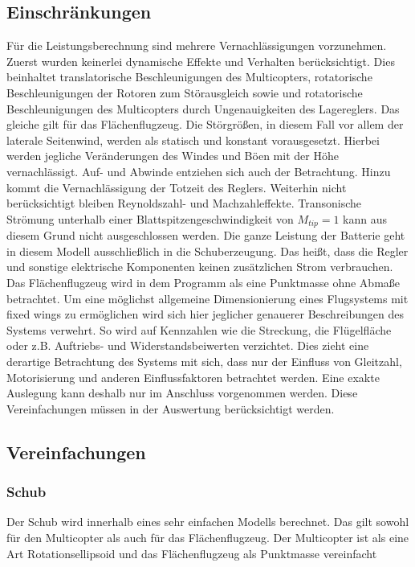 \subsection{Einschränkungen}
Für die Leistungsberechnung sind mehrere Vernachlässigungen vorzunehmen. Zuerst wurden keinerlei dynamische Effekte und Verhalten berücksichtigt. Dies beinhaltet translatorische Beschleunigungen des Multicopters, rotatorische Beschleunigungen der Rotoren zum Störausgleich sowie und rotatorische Beschleunigungen des Multicopters durch Ungenauigkeiten des Lagereglers. Das gleiche gilt für das Flächenflugzeug. 
Die Störgrößen, in diesem Fall vor allem der laterale Seitenwind, werden als statisch und konstant vorausgesetzt. Hierbei werden jegliche Veränderungen des Windes und Böen mit der Höhe vernachlässigt. Auf- und Abwinde entziehen sich auch der Betrachtung. Hinzu kommt die Vernachlässigung der Totzeit des Reglers. 
Weiterhin nicht berücksichtigt bleiben Reynoldszahl- und Machzahleffekte. Transonische Strömung unterhalb einer Blattspitzengeschwindigkeit von \ensuremath{M_{tip}=1} kann aus diesem Grund nicht ausgeschlossen werden.
Die ganze Leistung der Batterie geht in diesem Modell ausschließlich in die Schuberzeugung. Das heißt, dass die Regler und sonstige elektrische Komponenten keinen zusätzlichen Strom verbrauchen.
Das Flächenflugzeug wird in dem Programm als eine Punktmasse ohne Abmaße betrachtet. Um eine möglichst allgemeine Dimensionierung eines Flugsystems mit fixed wings zu ermöglichen wird sich hier jeglicher genauerer Beschreibungen des Systems verwehrt. So wird auf Kennzahlen wie die Streckung, die Flügelfläche oder z.B. Auftriebs- und Widerstandsbeiwerten verzichtet. Dies zieht eine derartige Betrachtung des Systems mit sich, dass nur der Einfluss von Gleitzahl, Motorisierung und anderen Einflussfaktoren betrachtet werden. Eine exakte Auslegung kann deshalb nur im Anschluss vorgenommen werden. Diese Vereinfachungen müssen in der Auswertung berücksichtigt werden.

\subsection{Vereinfachungen}
\subsubsection{Schub}
Der Schub wird innerhalb eines sehr einfachen Modells berechnet. Das gilt sowohl für den Multicopter als auch für das Flächenflugzeug. Der Multicopter ist als eine Art Rotationsellipsoid und das Flächenflugzeug als Punktmasse vereinfacht

